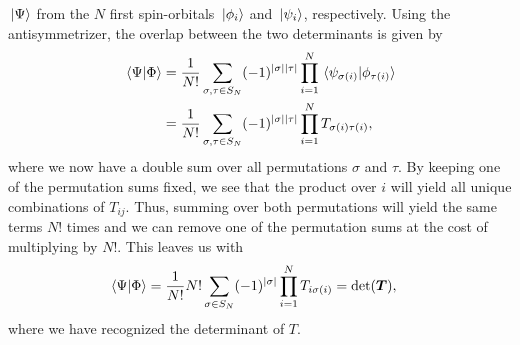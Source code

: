             $\ket*{\Psi}$ from the $N$ first spin-orbitals $\ket*{\phi_i}$ and
            $\ket*{\psi_i}$, respectively.
            Using the antisymmetrizer, the overlap between the two determinants
            is given by
            \begin{align}
                \braket*{\Psi}{\Phi}
                &=
                \frac{1}{N!}
                \sum_{\sigma, \tau \in S_N}
                (-1)^{\abs{\sigma}\abs{\tau}}
                \prod_{i = 1}^{N}
                \braket*{\psi_{\sigma(i)}}{\phi_{\tau(i)}}
                \\
                &=
                \frac{1}{N!}
                \sum_{\sigma, \tau \in S_N}
                (-1)^{\abs{\sigma}\abs{\tau}}
                \prod_{i = 1}^{N}
                T_{\sigma(i)\tau(i)},
            \end{align}
            where we now have a double sum over all permutations $\sigma$ and
            $\tau$.
            By keeping one of the permutation sums fixed, we see that the
            product over $i$ will yield all unique combinations of $T_{ij}$.
            Thus, summing over both permutations will yield the same terms $N!$
            times and we can remove one of the permutation sums at the cost of
            multiplying by $N!$.
            This leaves us with
            \begin{align}
                \braket*{\Psi}{\Phi}
                &=
                \frac{1}{N!} N!
                \sum_{\sigma \in S_N}
                (-1)^{\abs{\sigma}}
                \prod_{i = 1}^{N}
                T_{i\sigma(i)}
                =
                \det(\boldsymbol{T}),
            \end{align}
            where we have recognized the determinant of $T$.


